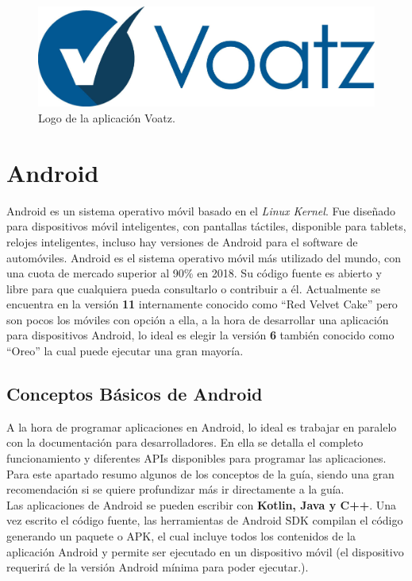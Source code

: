 \begin{figure}[h!]
  \centering
  \includegraphics[width=0.6\linewidth]{figs/EstadoArte/Apps/voatz}
  \caption[Nodos vista genérica]{Logo de la aplicación Voatz.}
  \label{fig:Voatz}
\end{figure}



\section{Android}

Android\cite{android} es un sistema operativo móvil basado en el \emph{Linux Kernel}. Fue diseñado para dispositivos móvil inteligentes, con pantallas táctiles, disponible para tablets, relojes inteligentes, incluso hay versiones de Android para el software de automóviles\cite{androidAuto}. Android es el sistema operativo móvil más utilizado del mundo, con una cuota de mercado superior al 90\% en 2018. Su código fuente es abierto y libre para que cualquiera pueda consultarlo o contribuir a él. Actualmente se encuentra en la versión \textbf{11} internamente conocido como ``Red Velvet Cake'' pero son pocos los móviles con opción a ella, a la hora de desarrollar una aplicación para dispositivos Android, lo ideal es elegir la versión \textbf{6} también conocido como ``Oreo'' la cual puede ejecutar una gran mayoría. 

\subsection{Conceptos Básicos de Android}

A la hora de programar aplicaciones en Android, lo ideal es trabajar en paralelo con la documentación para desarrolladores\cite{androidDocs}. En ella se detalla el completo funcionamiento y diferentes APIs disponibles para programar las aplicaciones. Para este apartado resumo algunos de los conceptos de la guía, siendo una gran recomendación si se quiere profundizar más ir directamente a la guía. \\

Las aplicaciones de Android se pueden escribir con \textbf{Kotlin, Java y C++}\cite{kotlin,java,c++}. Una vez escrito el código fuente, las herramientas de Android SDK compilan el código generando un paquete o APK, el cual incluye todos los contenidos de la aplicación Android y permite ser ejecutado en un dispositivo móvil (el dispositivo requerirá de la versión Android mínima para poder ejecutar.). \\

